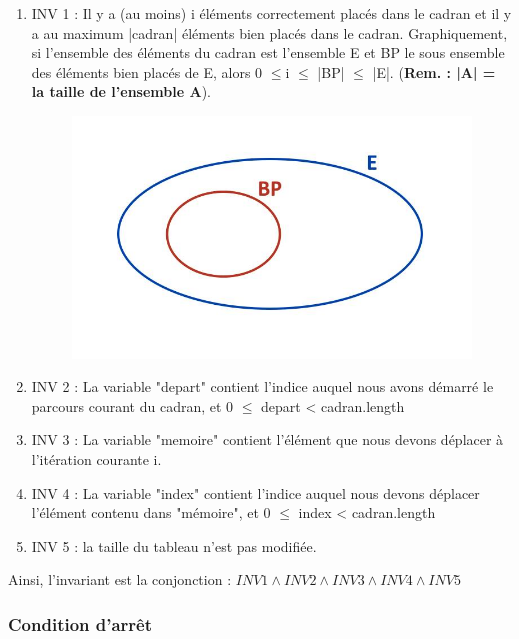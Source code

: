 \documentclass[a4paper, 12pt]{article}
\begin{document}
\begin{enumerate}
\item INV 1 : Il y a (au moins) i éléments correctement placés dans le cadran et il y a au maximum |cadran| éléments bien placés dans le cadran.
Graphiquement, si l'ensemble des éléments du cadran est l'ensemble E et BP le sous ensemble des éléments bien placés de E, alors 0 $\le$i $\le$ |BP| $\le$ |E|. (\textbf{Rem. : |A| = la taille de l'ensemble A}).\\

\begin{figure}[h]
   \includegraphics[scale=0.5]{Ensembles}
\end{figure}


\item INV 2 : La variable "depart" contient l'indice auquel nous avons démarré le parcours courant du cadran, et 0 $\le$ depart < cadran.length

\item INV 3 : La variable "memoire" contient l'élément que nous devons déplacer à l'itération courante i.

\item INV 4 : La variable "index" contient l'indice auquel nous devons déplacer l'élément contenu dans "mémoire", et 0 $\le$ index < cadran.length

\item INV 5 : la taille du tableau n'est pas modifiée.
\end{enumerate}

Ainsi, l'invariant est la conjonction : $INV 1 \wedge INV 2 \wedge INV 3 \wedge INV 4 \wedge INV 5$



\subsubsection*{Condition d'arrêt}
\end{document}

